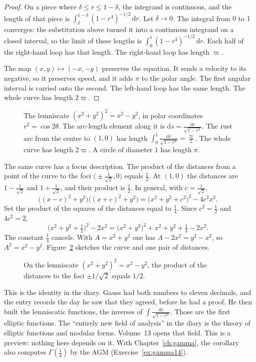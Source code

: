 \begin{proof}
On a piece where $\delta\le r\le1-\delta$, the integrand is continuous, and the length of that piece is $\int_\delta^{1-\delta}(1-r^4)^{-1/2}\,\mathrm dr$. Let $\delta\to0$. The integral from $0$ to $1$ converges: the substitution above turned it into a continuous integrand on a closed interval, so the limit of these lengths is $\int_0^1(1-r^4)^{-1/2}\,\mathrm dr$. Each half of the right-hand loop has that length. The right-hand loop has length $\varpi$.

The map $(x,y)\mapsto(-x,-y)$ preserves the equation. It sends a velocity to its negative, so it preserves speed, and it adds $\pi$ to the polar angle. The first angular interval is carried onto the second. The left-hand loop has the same length. The whole curve has length $2\varpi$.
\end{proof}

\begin{figure}[ht]
\centering
{}
\caption{The lemniscate $(x^2+y^2)^2=x^2-y^2$, in polar coordinates $r^2=\cos2\theta$. The arc-length element along it is $\mathrm ds=\frac{\mathrm dr}{\sqrt{1-r^4}}$. The rust arc from the centre to
$(1,0)$ has length $\int_0^1\frac{\mathrm dr}{\sqrt{1-r^4}}=\frac\varpi2$. The whole curve has length $2\varpi$. A circle of diameter $1$ has length $\pi$.}
\label{fig:lemniscate}
\end{figure}

The same curve has a focus description. The product of the distances from a point of the curve to the foci $\bigl(\pm\frac1{\sqrt2},0\bigr)$ equals $\frac12$. At $(1,0)$ the distances are $1-\frac1{\sqrt2}$ and $1+\frac1{\sqrt2}$, and their product is $\frac12$. In general, with $c=\frac1{\sqrt2}$,
\[
\bigl((x-c)^2+y^2\bigr)\bigl((x+c)^2+y^2\bigr)=\bigl(x^2+y^2+c^2\bigr)^2-4c^2x^2.
\]
Set the product of the squares of the distances equal to $\frac14$. Since $c^2=\frac12$ and $4c^2=2$,
\[
\bigl(x^2+y^2+\tfrac12\bigr)^2-2x^2=\bigl(x^2+y^2\bigr)^2+x^2+y^2+\tfrac14-2x^2.
\]
The constant $\frac14$ cancels. With $A=x^2+y^2$ one has $A-2x^2=y^2-x^2$, so $A^2=x^2-y^2$. Figure~\ref{fig:rw13-lemniscate} sketches the curve and one pair of distances.

\begin{figure}[ht]
\centering
{}
\caption{On the lemniscate $(x^2+y^2)^2=x^2-y^2$, the product of the distances to the foci $\pm1/\sqrt2$ equals $1/2$.}
\label{fig:rw13-lemniscate}
\end{figure}

\begin{beauty}
This is the identity in the diary. Gauss had both numbers to eleven decimals, and the entry records the day he saw that they agreed, before he had a proof. He then built the lemniscatic functions, the inverses of $\int\frac{\mathrm dr}{\sqrt{1-r^4}}$. Those are the first elliptic functions. The ``entirely new field of analysis'' in the diary is the theory of elliptic functions and modular forms. Volume~13 opens that field. This is a preview: nothing here depends on it. With Chapter~\ref{ch:gamma}, the corollary also computes $\Gamma(\frac14)$ by the AGM (Exercise~\ref{ex:gamma14}).
\end{beauty}

